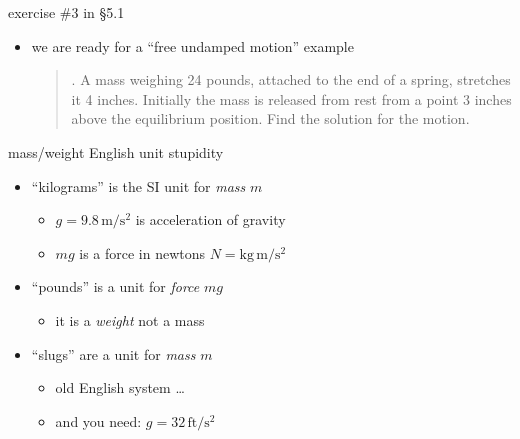 \documentclass[dvipsnames,colorlinks]{beamer}
\begin{document}
\begin{frame}{exercise \#3 in \S5.1}

\begin{itemize}
\item we are ready for a ``free undamped motion'' example

\medskip
\begin{quotation}
. A mass weighing 24 pounds, attached to the end of a spring, stretches it 4 inches.  Initially the mass is released from rest from a point 3 inches above the equilibrium position.  Find the solution for the motion.
\end{quotation}
\end{itemize}

\vspace{40mm}
\end{frame}


\begin{frame}{mass/weight English unit stupidity}

\begin{itemize}
\item ``kilograms'' is the SI unit for \emph{mass} $m$
    \begin{itemize}
    \item $g=9.8 \,\text{m}/\text{s}^2$ is acceleration of gravity
    \item $mg$ is a force in newtons $N = \text{kg}\,\text{m}/\text{s}^2$
    \end{itemize}
\item ``pounds'' is a unit for \emph{force} $mg$
    \begin{itemize}
    \item it is a \emph{weight} not a mass
    \end{itemize}
\item ``slugs'' are a unit for \emph{mass} $m$
    \begin{itemize}
    \item old English system \dots
    \item and you need: $g=32 \,\text{ft}/\text{s}^2$
    \end{itemize}
\end{itemize}
\end{frame}
\end{document}
